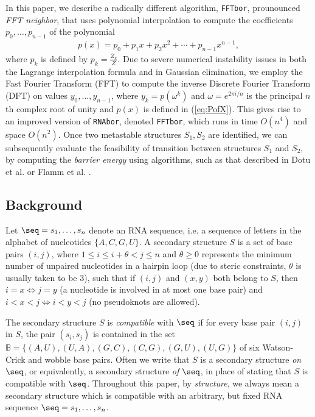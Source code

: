 In this paper, we describe a radically different algorithm, {\tt FFTbor},
prounounced {\em FFT neighbor},
that uses polynomial interpolation to compute the
coefficients $p_0,\ldots,p_{n-1}$ of the polynomial
\begin{eqnarray}
\label{eq:PofX}
p(x) = p_0 + p_1 x + p_2 x^2 + \cdots + p_{n-1} x^{n-1},
\end{eqnarray}
where $p_k$ is defined by $p_k = \frac{Z_k}{Z}$.
Due to severe numerical instability issues in both the Lagrange
interpolation formula and in Gaussian elimination, we employ
the Fast Fourier Transform (FFT) to compute the inverse Discrete Fourier
Transform (DFT) on values $y_0,\ldots,y_{n-1}$, where $y_k = p(\omega^k)$ and
$\omega = e^{2 \pi i/n}$ is the principal $n$th complex root of unity and
$p(x)$ is defined in (\ref{eq:PofX}). This
gives rise to an improved version of {\tt RNAbor}, denoted {\tt FFTbor},
which runs in time $O(n^4)$ and space $O(n^2)$.
Once two metastable structures $S_1,S_2$ are identified, we can
subsequently evaluate the feasibility of transition between
structures $S_1$ and $S_2$,
by computing the {\em barrier energy} using algorithms, such as that
described in Dotu et al.  \cite{Dotu.nar10} or Flamm et al.
\cite{Flamm.r01}.





\subsection*{Background}

Let $\seq = s_1,\ldots,s_n$ denote an RNA sequence, i.e. a sequence
of letters in the alphabet of nucleotides $\{A,C,G,U\}$. A
secondary structure $S$ is a set of base pairs
$(i,j)$, where $1 \le i \le i+\theta < j \le n$ and $\theta \ge 0$
represents the minimum number of unpaired nucleotides in a hairpin loop
(due to steric constraints, $\theta$ is usually taken to be $3$),
such that if $(i,j)$ and $(x,y)$ both belong to $S$, then $i=x \iff j=y$
(a nucleotide is involved in at most one base pair)
and $i<x<j \iff i<y<j$ (no pseudoknots are allowed).

The secondary structure $S$ is {\em compatible}
with $\seq$ if for every base pair $(i,j)$ in $S$, the pair
$(s_i,s_j)$ is contained in the set
$\mathbb{B} = \{(A,U), (U,A), (G,C), (C,G), (G,U), (U,G)\}$
of six Watson-Crick and wobble base pairs. Often we write that
$S$ is a secondary structure {\em on} $\seq$, or equivalently,
a secondary structure {\em of} $\seq$,
in place of stating that $S$ is compatible with $\seq$.
Throughout this paper, by {\em structure}, we always mean a
secondary structure which is compatible with an arbitrary, but fixed
RNA sequence $\seq=s_1,\ldots,s_n$.

